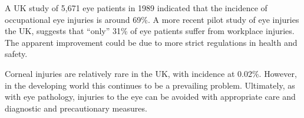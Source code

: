 A UK study of 5,671 eye patients in 1989 indicated that the incidence of
occupational eye injuries is around 69\%.\cite{macewen1989eye} A more
recent pilot study of eye injuries the UK, suggests that \enquote{only} 31\%
of eye patients suffer from workplace injuries.\cite{thompson2009occupational}
The apparent improvement could be due to more strict regulations in health
and safety.

Corneal injuries are relatively rare in the UK, with incidence at
0.02\%.\cite{macdonald2009surveillance} However, in the developing
world this continues to be a prevailing problem.\cite{whitcher2001corneal}
Ultimately, as with eye pathology, injuries to the eye can be avoided with
appropriate care and diagnostic and precautionary measures.
